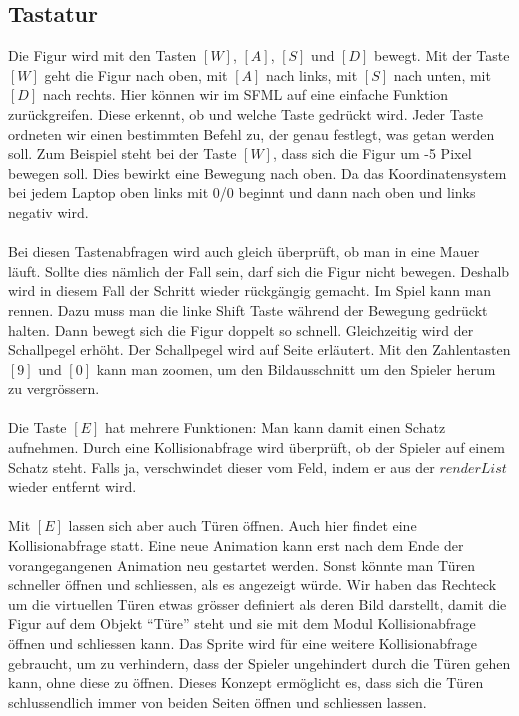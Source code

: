 \documentclass[11pt,a4paper]{scrbook}
\newcommand{\q}[1]{``#1''}
\newcommand{\key}[1]{$[#1]$}
\begin{document}
\subsection{Tastatur}
Die Figur wird mit den Tasten \key{W}, \key{A}, \key{S} und \key{D} bewegt. Mit der Taste \key{W} geht die Figur nach oben, mit \key{A} nach links, mit \key{S} nach unten, mit \key{D} nach rechts. Hier können wir im SFML auf eine einfache Funktion zurückgreifen. Diese erkennt, ob und welche Taste gedrückt wird. Jeder Taste ordneten wir einen bestimmten Befehl zu, der genau festlegt, was getan werden soll. Zum Beispiel steht bei der Taste \key{W}, dass sich die Figur um -5 Pixel bewegen soll. Dies bewirkt eine Bewegung nach oben. Da das Koordinatensystem bei jedem Laptop oben links mit 0/0 beginnt und dann nach oben und links negativ wird.\\
\\
Bei diesen Tastenabfragen wird auch gleich überprüft, ob man in eine Mauer läuft. Sollte dies nämlich der Fall sein, darf sich die Figur nicht bewegen.
Deshalb wird in diesem Fall der Schritt wieder rückgängig gemacht. 
Im Spiel kann man rennen. 
Dazu muss man die linke Shift Taste während der Bewegung gedrückt halten. Dann bewegt sich die Figur doppelt so schnell. Gleichzeitig wird der Schallpegel erhöht. 
Der Schallpegel wird auf Seite \pageref{Schall} erläutert.
Mit den Zahlentasten \key{9} und \key{0} kann man zoomen, um den Bildausschnitt um den Spieler herum zu vergrössern.\\
\\
Die Taste \key{E} hat mehrere Funktionen: Man kann damit einen Schatz aufnehmen. 
Durch eine Kollisionabfrage wird überprüft, ob der Spieler auf einem Schatz steht. 
Falls ja, verschwindet dieser vom Feld, indem er aus der $renderList$  wieder entfernt wird.\\
\\
Mit \key{E} lassen sich aber auch Türen öffnen. 
Auch hier findet eine Kollisionabfrage statt. 
Eine neue Animation kann erst nach dem Ende der vorangegangenen Animation neu gestartet werden. 
Sonst könnte man Türen schneller öffnen und schliessen, als es angezeigt würde. 
Wir haben das Rechteck um die virtuellen Türen etwas grösser definiert als deren Bild darstellt, damit die Figur auf dem Objekt \q{Türe} steht und sie mit dem Modul Kollisionabfrage öffnen und schliessen kann. Das Sprite wird für eine weitere Kollisionabfrage gebraucht, um zu verhindern, dass der Spieler ungehindert durch die Türen gehen kann, ohne diese zu öffnen. 
Dieses Konzept ermöglicht es, dass sich die Türen schlussendlich immer von beiden Seiten öffnen und schliessen lassen.
\end{document}
